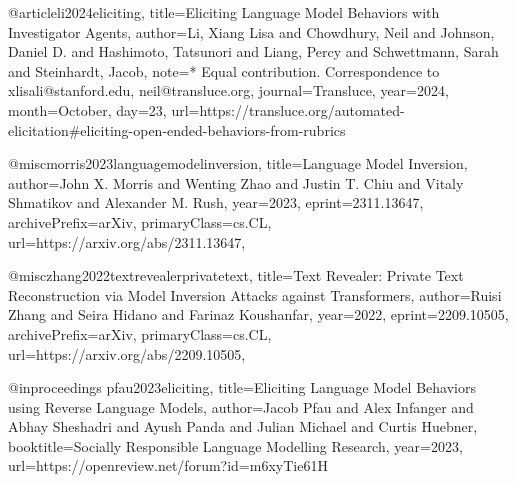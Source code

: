 @article{li2024eliciting,
  title={Eliciting Language Model Behaviors with Investigator Agents},
  author={Li, Xiang Lisa and Chowdhury, Neil and Johnson, Daniel D. and Hashimoto, Tatsunori and Liang, Percy and Schwettmann, Sarah and Steinhardt, Jacob},
  note={* Equal contribution. Correspondence to xlisali@stanford.edu, neil@transluce.org},
  journal={Transluce},
  year={2024},
  month={October},
  day={23},
  url={https://transluce.org/automated-elicitation#eliciting-open-ended-behaviors-from-rubrics}
}

@misc{morris2023languagemodelinversion,
      title={Language Model Inversion}, 
      author={John X. Morris and Wenting Zhao and Justin T. Chiu and Vitaly Shmatikov and Alexander M. Rush},
      year={2023},
      eprint={2311.13647},
      archivePrefix={arXiv},
      primaryClass={cs.CL},
      url={https://arxiv.org/abs/2311.13647}, 
}

@misc{zhang2022textrevealerprivatetext,
      title={Text Revealer: Private Text Reconstruction via Model Inversion Attacks against Transformers}, 
      author={Ruisi Zhang and Seira Hidano and Farinaz Koushanfar},
      year={2022},
      eprint={2209.10505},
      archivePrefix={arXiv},
      primaryClass={cs.CL},
      url={https://arxiv.org/abs/2209.10505}, 
}

@inproceedings{
pfau2023eliciting,
title={Eliciting Language Model Behaviors using Reverse Language Models},
author={Jacob Pfau and Alex Infanger and Abhay Sheshadri and Ayush Panda and Julian Michael and Curtis Huebner},
booktitle={Socially Responsible Language Modelling Research},
year={2023},
url={https://openreview.net/forum?id=m6xyTie61H}
}